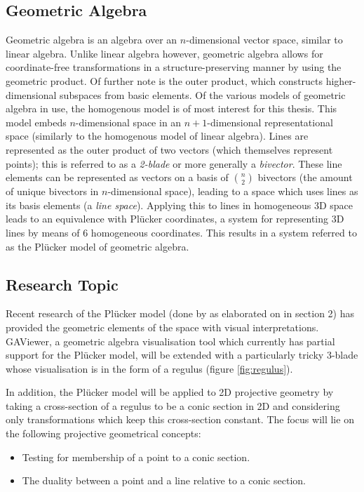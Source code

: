 \documentclass[a4paper, 10pt]{article}
\begin{document}
\subsection{Geometric Algebra}
Geometric algebra\cite{dorst2009geometric} is an algebra over an $n$-dimensional
vector space, similar to
linear algebra. Unlike linear algebra however, geometric algebra allows for
coordinate-free transformations in a structure-preserving manner by using the
geometric product. Of further note is the outer product, which constructs
higher-dimensional subspaces from basic elements. Of the various models of
geometric algebra in use, the homogenous model is of most interest for this thesis.
This model embeds $n$-dimensional space in an $n + 1$-dimensional representational
space (similarly to the homogenous model of linear algebra).  Lines are
represented as the outer product of two vectors (which themselves represent
points); this is referred to as a \emph{2-blade} or more generally a
\emph{bivector}. These line elements can be represented as vectors on a basis of
$n \choose 2$ bivectors (the amount of unique bivectors in $n$-dimensional
space), leading to a space which uses lines as its basis elements (a \emph{line
space}). Applying this to lines in homogeneous 3D space leads to an equivalence
with Pl\"{u}cker coordinates, a system for representing 3D lines by means of 6
homogeneous coordinates. This results in a system referred to as the Pl\"{u}cker
model of geometric algebra.

\subsection{Research Topic}
Recent research of the Pl\"{u}cker model (done by \cite{hangbo2011}
\cite{dorst2013versors} \cite{pottmann2001computational} \cite{dekok2012} as
elaborated on in section 2) has provided the geometric elements of the space
with visual interpretations. GAViewer, a geometric algebra visualisation tool
which currently has partial support for the Pl\"{u}cker model, will be extended
with a particularly tricky 3-blade whose visualisation is in the form of a
regulus (figure \ref{fig:regulus}).

In addition, the Pl\"{u}cker model will be applied to 2D projective geometry by
taking a cross-section of a regulus to be a conic section in 2D and considering
only transformations which keep this cross-section constant. The focus will lie
on the following projective geometrical concepts:
\begin{itemize}
  \item Testing for membership of a point to a conic section.
  \item The duality between a point and a line relative to a conic section.
\end{itemize}
\end{document}
